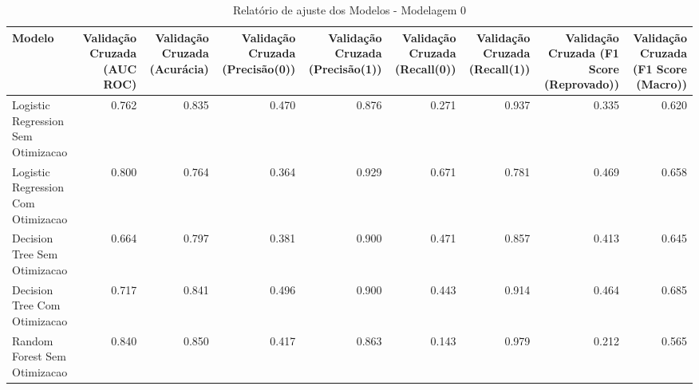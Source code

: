 \begin{table}[H] %
    \centering
    \caption{Relatório de ajuste dos Modelos - Modelagem 0}
    \label{tab:relatorio_ajuste_modelagem_0}
    \renewcommand{\arraystretch}{1.25} %
    \begin{adjustwidth}{ -1in }{ -1in } %
    \centering %
    \small %
    \begin{tabular}{lrrrrrrrr}
\toprule
                            Modelo &  Validação Cruzada (AUC ROC) &  Validação Cruzada (Acurácia) &  Validação Cruzada (Precisão(0)) &  Validação Cruzada (Precisão(1)) &  Validação Cruzada (Recall(0)) &  Validação Cruzada (Recall(1)) &  Validação Cruzada (F1 Score (Reprovado)) &  Validação Cruzada (F1 Score (Macro)) \\
\midrule
Logistic Regression Sem Otimizacao &                        0.762 &                         0.835 &                            0.470 &                            0.876 &                          0.271 &                          0.937 &                                     0.335 &                                 0.620 \\
Logistic Regression Com Otimizacao &                        0.800 &                         0.764 &                            0.364 &                            0.929 &                          0.671 &                          0.781 &                                     0.469 &                                 0.658 \\
      Decision Tree Sem Otimizacao &                        0.664 &                         0.797 &                            0.381 &                            0.900 &                          0.471 &                          0.857 &                                     0.413 &                                 0.645 \\
      Decision Tree Com Otimizacao &                        0.717 &                         0.841 &                            0.496 &                            0.900 &                          0.443 &                          0.914 &                                     0.464 &                                 0.685 \\
      Random Forest Sem Otimizacao &                        0.840 &                         0.850 &                            0.417 &                            0.863 &                          0.143 &                          0.979 &                                     0.212 &                                 0.565 \\

\end{tabular}
\end{adjustwidth}
\end{table}
